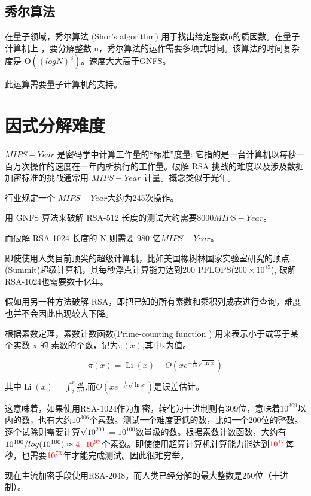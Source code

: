 \documentclass{article}
\begin{document}
\subsection{秀尔算法}
在量子领域，秀尔算法 (Shor’s algorithm) 用于找出给定整数n的质因数。在量子计算机上 ，要分解整数 n，秀尔算法的运作需要多项式时间。该算法的时间复杂度是 $\mathrm{O}\left(\left( logN\right)^3\right)$。速度大大高于GNFS。

此运算需要量子计算机的支持。

\section{因式分解难度}

$MIPS-Year$ 是密码学中计算工作量的“标准”度量: 它指的是一台计算机以每秒一百万次操作的速度在一年内所执行的工作量。破解 RSA 挑战的难度以及涉及数据加密标准的挑战通常用 $MIPS-Year$ 计量。概念类似于光年。

行业规定一个 $MIPS-Year$大约为245次操作。

用 GNFS 算法来破解 RSA-512 长度的测试大约需要8000$MIPS-Year$。

而破解 RSA-1024 长度的 N 则需要 980 亿$MIPS-Year$。

即使使用人类目前顶尖的超级计算机，比如美国橡树林国家实验室研究的顶点(Summit)超级计算机，其每秒浮点计算能力达到200 PFLOPS($200 \times 10^{15}$), 破解RSA-1024也需要数十亿年。

假如用另一种方法破解 RSA，即把已知的所有素数和乘积列成表进行查询，难度也并不会因此出现较大下降。

根据素数定理，素数计数函数(Prime-counting function
) 用来表示小于或等于某个实数 x 的 素数的个数，记为$\pi(x)$,其中x为值。

$$
\pi(x)=\operatorname{Li}(x)+O\left(x e^{-\frac{1}{15} \sqrt{\ln x}}\right)
$$

其中$\operatorname{Li}(x) = \int_{2}^{x} \frac{dt}{lnt}	$,而$O\left(x e^{-\frac{1}{15} \sqrt{\ln x}}\right)$是误差估计。

这意味着，如果使用RSA-1024作为加密，转化为十进制则有309位，意味着$10^{309}$以内的数，也有大约$10^{306}$个素数。测试一个难度更低的数，比如一个200位的整数。逐个试除则需要计算$\sqrt{10^{200}} = 10^{100}$数量级的数。根据素数计数函数，大约有$10^{100}/log(10^{100}) \approx {\color{red}4 \cdot 10^{97}}$个素数。即使使用超算计算机计算能力能达到${\color{red}10^{17}}$每秒，也需要${\color{red}10^{73}}$年才能完成测试。因此很难穷举。

现在主流加密手段使用RSA-2048。而人类已经分解的最大整数是250位（十进制）。
\end{document}
